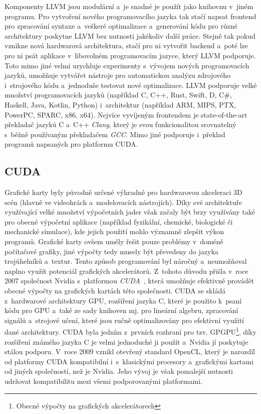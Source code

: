 Komponenty LLVM jsou modulární a~je snadné je použít jako knihovnu v~jiném programu. Pro vytvoření nového programovacího jazyka tak stačí napsat frontend pro zpracování syntaxe a~veškeré optimalizace a~generování kódu pro různé architektury poskytne LLVM bez nutnosti jakékoliv další práce. Stejně tak pokud vznikne nová hardwarová architektura, stačí pro ni vytvořit backend a~poté lze pro ni psát aplikace v~libovolném programovacím jazyce, který LLVM podporuje. Toto mimo jiné velmi urychluje experimenty s~vývojem nových programovacích jazyků, umožňuje vytvářet nástroje pro automatickou analýzu zdrojového i~strojového kódu a~jednoduše testovat nové optimalizace.
LLVM podporuje velké množství programovacích jazyků (například C, C++, Rust, Swift, D, C\#, Haskell, Java, Kotlin, Python) i~architektur (například ARM, MIPS, PTX, PowerPC, SPARC, x86, x64). Nejvíce vyvíjeným frontendem je state-of-the-art překladač jazyků C a~C++ \emph{Clang}, který je svou funkcionalitou srovnatelný s~běžně používaným překladačem \emph{GCC}. Mimo jiné podporuje i~překlad programů napsaných pro platformu CUDA.

\subsection{CUDA}
Grafické karty byly původně určené výhradně pro hardwarovou akceleraci 3D scén (hlavně ve videohrách a~modelovacích nástrojích). Díky své architektuře využívající velké množství výpočetních jader však začaly být brzy využívány také pro obecné výpočetní aplikace (například fyzikální, chemické, biologické či mechanické simulace), kde jejich použití mohlo významně zlepšit výkon programů. Grafické karty ovšem uměly řešit pouze problémy v~doméně počítačové grafiky, jiné výpočty tedy musely být převedeny do jazyka trojúhelníků a~textur. Tento způsob programování byl náročný a~neumožňoval naplno využít potenciál grafických akcelerátorů. Z~tohoto důvodu přišla v~roce 2007 společnost Nvidia s~platformou \emph{CUDA}~\cite{cuda}, která umožňuje efektivně provádět obecné výpočty na grafických kartách této společnosti. CUDA se skládá z~hardwarové architektury GPU, rozšíření jazyka C, které je použito k~psaní kódu pro GPU a~také ze sady knihoven mj. pro lineární algebru, zpracování signálů a~strojové učení, které jsou ručně optimalizovány pro efektivní využití dané architektury. CUDA byla jedním z~prvních rozhraní pro tzv. GPGPU\footnote{Obecné výpočty na grafických akcelerátorech}, díky rozšíření známého jazyka C je velmi jednoduché ji použít a~Nvidia jí poskytuje stálou podporu. V~roce 2009 vznikl otevřený standard OpenCL, který je narozdíl od platformy CUDA kompatibilní i~s~klasickými procesory a~grafickými kartami od jiných společností, než je Nvidia. Jeho vývoj je však pomalejší nutnosti udržovat kompatibilitu mezi všemi podporovanými platformami.


